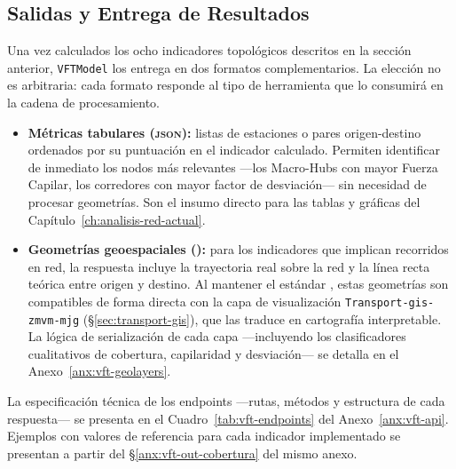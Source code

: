 
\subsection{Salidas y Entrega de Resultados}
\label{sec:vft-salidas}

Una vez calculados los ocho indicadores topológicos descritos en la sección
anterior, \texttt{VFTModel} los entrega en dos formatos complementarios. La elección no
es arbitraria: cada formato responde al tipo de herramienta que lo consumirá en
la cadena de procesamiento.

\begin{itemize}
    \item \textbf{Métricas tabulares (\textsc{json}):} listas de estaciones o
    pares origen-destino ordenados por su puntuación en el indicador calculado.
    Permiten identificar de inmediato los nodos más relevantes ---los
    Macro-Hubs con mayor Fuerza Capilar, los corredores con mayor
    factor de desviación--- sin necesidad de procesar geometrías. Son el
    insumo directo para las tablas y gráficas del
    Capítulo~\ref{ch:analisis-red-actual}.

    \item \textbf{Geometrías geoespaciales (\geojson{}):} para los indicadores
    que implican recorridos en red, la respuesta incluye la trayectoria real
    sobre la red y la línea recta teórica entre origen y destino. Al mantener
    el estándar \geojson{}, estas geometrías son compatibles de forma directa
    con la capa de visualización \texttt{Transport-gis-zmvm-mjg}
    (§\ref{sec:transport-gis}), que las traduce en cartografía interpretable.
    La lógica de serialización de cada capa —incluyendo los clasificadores
    cualitativos de cobertura, capilaridad y desviación— se detalla en el
    Anexo~\ref{anx:vft-geolayers}.
\end{itemize}

La especificación técnica de los endpoints ---rutas, métodos y estructura de
cada respuesta--- se presenta en el Cuadro~\ref{tab:vft-endpoints} del
Anexo~\ref{anx:vft-api}. Ejemplos con valores de referencia para cada indicador
implementado se presentan a partir del §\ref{anx:vft-out-cobertura} del mismo
anexo.

